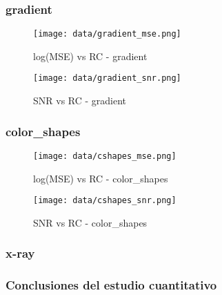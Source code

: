 \documentclass[12pt,a4paper]{article}
\begin{document}
\subsubsection{gradient}
\hspace*{-2.5em}
\begin{minipage}{0.5\textwidth}
        \centering
        \begin{figure}[H]
    \centering
    \texttt{[image: data/gradient\_mse.png]}
    \caption{log(MSE) vs RC - gradient}
    
\end{figure}
\end{minipage}\hfill
    \begin{minipage}{0.5\textwidth}
        \centering
        \begin{figure}[H]
    \centering
    \texttt{[image: data/gradient\_snr.png]}
    \caption{SNR vs RC - gradient}
    
\end{figure}
\end{minipage}

\subsubsection{color\_shapes}
\hspace*{-2.5em}
\begin{minipage}{0.5\textwidth}
        \centering
        \begin{figure}[H]
    \centering
    \texttt{[image: data/cshapes\_mse.png]}
    \caption{log(MSE) vs RC - color\_shapes}
    
\end{figure}
\end{minipage}\hfill
    \begin{minipage}{0.5\textwidth}
        \centering
        \begin{figure}[H]
    \centering
    \texttt{[image: data/cshapes\_snr.png]}
    \caption{SNR vs RC - color\_shapes}
    
\end{figure}
\end{minipage}

\subsubsection{x-ray}

\subsubsection{Conclusiones del estudio cuantitativo}
\end{document}
